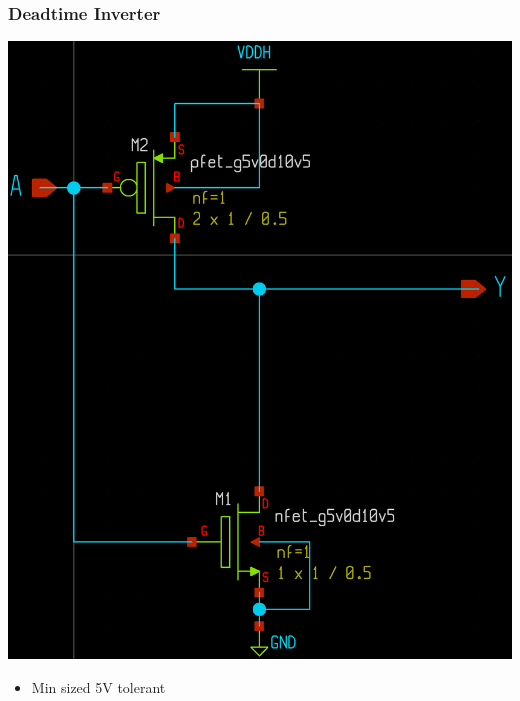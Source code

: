\documentclass{beamer}
\begin{document}
\begin{frame}
  \frametitle{Deadtime Inverter}
  \includegraphics[scale=0.09]{inverter.png}
  \begin{itemize}
  \item Min sized 5V tolerant
  \end{itemize}
\end{frame}
\end{document}
